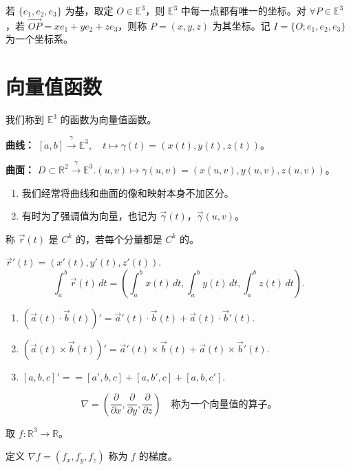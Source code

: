 \documentclass[lang=cn,10pt,thmcnt=section]{elegantbook}
\begin{document}
\begin{definition}[坐标系]
    若 $\{e_1, e_2, e_3\}$ 为基，取定 $O \in \mathbb{E}^3$，则 $\mathbb{E}^3$ 中每一点都有唯一的坐标。对 $\forall P \in \mathbb{E}^3$，若 $\overrightarrow{OP} = x e_1 + y e_2 + z e_3$，则称 $P = (x, y, z)$ 为其坐标。记 $I = \{O; e_1, e_2, e_3\}$ 为一个坐标系。
\end{definition}
\section{向量值函数}
我们称到 $\mathbb{E}^3$ 的函数为向量值函数。

\textbf{曲线：} $[a,b] \xrightarrow{\gamma} \mathbb{E}^3, \quad t \mapsto \gamma(t) = (x(t), y(t), z(t))$。

\textbf{曲面：} $D \subset \mathbb{R}^2 \xrightarrow{\gamma} \mathbb{E}^3$.$(u,v) \mapsto \gamma(u,v) = (x(u,v), y(u,v), z(u,v))$。

\begin{enumerate} 
    \item 我们经常将曲线和曲面的像和映射本身不加区分。
    \item 有时为了强调值为向量，也记为 $\vec{\gamma}(t)$，$\vec{\gamma}(u,v)$。
\end{enumerate}

称 $\vec{r}(t)$ 是 $C^k$ 的，若每个分量都是 $C^k$ 的。

\begin{definition}
    $\vec{r}'(t) = (x'(t), y'(t), z'(t))$.
    \[
    \int_a^b \vec{r}(t) \, dt = \left( \int_a^b x(t) \, dt, \int_a^b y(t) \, dt, \int_a^b z(t) \, dt \right).
    \]
\end{definition}

\begin{proposition}[Leibniz法则]
    \begin{enumerate}
        \item $\left( \vec{a}(t) \cdot \vec{b}(t) \right)' = \vec{a}'(t) \cdot \vec{b}(t) + \vec{a}(t) \cdot \vec{b}'(t)$.
        \item $\left( \vec{a}(t) \times \vec{b}(t) \right)' = \vec{a}'(t) \times \vec{b}(t) + \vec{a}(t) \times \vec{b}'(t)$.
        \item $[a, b, c]'== [a', b, c] + [a, b', c] + [a, b, c'].$
    \end{enumerate}
\end{proposition}

\begin{definition}[nabla算子]
    \[
\nabla = \left( \frac{\partial}{\partial x}, \frac{\partial}{\partial y}, \frac{\partial}{\partial z} \right) \quad \text{称为一个向量值的算子。}
\]
\end{definition}
取 $f: \mathbb{R}^3 \rightarrow \mathbb{R}$。
\begin{definition}[梯度]
    定义 $\nabla f = (f_x, f_y, f_z)$ 称为 $f$ 的梯度。
    \end{definition}
    
\end{document}
